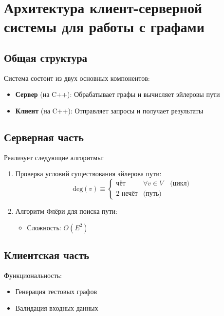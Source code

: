 \documentclass{article}
\begin{document}
\section*{Архитектура клиент-серверной системы для работы с графами}



\subsection*{Общая структура}
Система состоит из двух основных компонентов:
\begin{itemize}
    \item \textbf{Сервер} (на C++): Обрабатывает графы и вычисляет эйлеровы пути
    \item \textbf{Клиент} (на C++): Отправляет запросы и получает результаты
\end{itemize}

\subsection*{Серверная часть}
Реализует следующие алгоритмы:
\begin{enumerate}
    \item Проверка условий существования эйлерова пути:
    \[
    \text{deg}(v) \equiv 
    \begin{cases} 
    \text{чёт} & \forall v \in V \quad \text{(цикл)} \\
    \text{2 нечёт} & \text{(путь)}
    \end{cases}
    \]
    
    \item Алгоритм Флёри для поиска пути:
    \begin{itemize}
        \item Сложность: $O(E^2)$
    \end{itemize}
\end{enumerate}

\subsection*{Клиентская часть}
Функциональность:
\begin{itemize}
    \item Генерация тестовых графов
    \item Валидация входных данных
\end{itemize}
\end{document}
